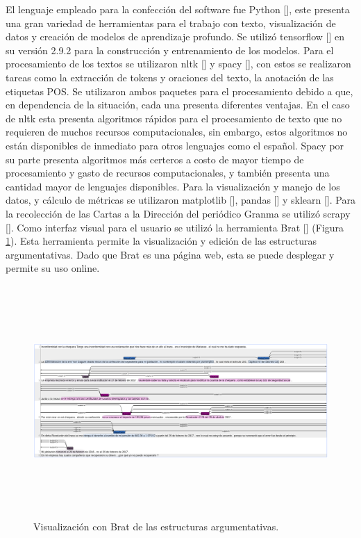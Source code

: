El lenguaje empleado para la confección del software fue Python [\cite{python}], este presenta 
una gran variedad de herramientas 
para el trabajo con texto, visualización de datos y creación de modelos de aprendizaje profundo.
Se utilizó tensorflow [\cite{tensorflow}] en su versión 2.9.2 para la construcción y entrenamiento de los modelos. 
Para el procesamiento de los textos se utilizaron nltk [\cite{nltk}] y spacy [\cite{spacy}], con estos se realizaron tareas
como la extracción de tokens y oraciones del texto, la anotación de las etiquetas POS. Se utilizaron 
ambos paquetes para el procesamiento debido a que, en dependencia de la situación, cada una presenta diferentes
ventajas. En el caso de nltk esta presenta algoritmos rápidos para el procesamiento de texto que no 
requieren de muchos recursos computacionales, sin embargo, estos algoritmos no están disponibles de inmediato
para otros lenguajes como el español. Spacy por su parte presenta algoritmos más certeros a costo 
de mayor tiempo de procesamiento y gasto de recursos computacionales, y también presenta una cantidad mayor de lenguajes 
disponibles. Para la visualización y manejo de los datos, y cálculo de métricas se utilizaron 
matplotlib [\cite{matplotlib}], pandas [\cite{pandas}] y sklearn [\cite{sklearn}]. 
Para la recolección de las Cartas a la Dirección del periódico Granma se utilizó scrapy [\cite{scrapy}].
Como interfaz visual para el usuario se utilizó la herramienta Brat [\cite{brat}] 
(Figura \ref{fig:brat_persuasive_granma_letters}). Esta herramienta permite
la visualización y edición de las estructuras argumentativas. Dado que Brat es una página web, esta se puede
desplegar y permite su uso online.

\begin{figure}[h!]
	\begin{center}
		\includegraphics[scale=.4, width=435pt, height=250pt]{Graphics/persuasive_2019-03-22|inconformidad-con-la-chequera.png}
		\caption{Visualización con Brat de las estructuras argumentativas.}\label{fig:brat_persuasive_granma_letters}
	\end{center}
\end{figure}

